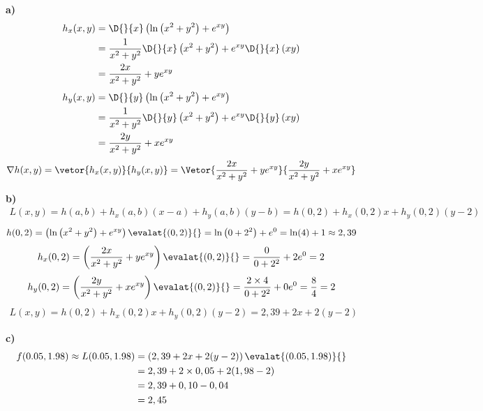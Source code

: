 \documentclass[a4paper,12pt,fleqn]{article}
\begin{document}
\begin{answer}
\textbf{a)}
\vspace{-\baselineskip}
  \begin{align*}
    h_x(x, y)
    & = \D{}{x}\left(\ln\left(x^2+y^2\right) + e^{xy}\right) \\
    & = \frac{1}{x^2+y^2}\D{}{x}\left(x^2+y^2\right)
      + e^{xy}\D{}{x}\left(xy\right) \\
    & = \frac{2x}{x^2+y^2} + ye^{xy}
  \end{align*}
  \begin{align*}
    h_y(x, y)
    & = \D{}{y}\left(\ln\left(x^2+y^2\right) + e^{xy}\right) \\
    & = \frac{1}{x^2+y^2}\D{}{y}\left(x^2+y^2\right)
      + e^{xy}\D{}{y}\left(xy\right) \\
    & = \frac{2y}{x^2+y^2} + xe^{xy}
  \end{align*}
  \[
    \nabla h(x, y)
    = \vetor{h_x(x, y)}{h_y(x, y)}
    = \Vetor{\frac{2x}{x^2+y^2} + ye^{xy}}{\frac{2y}{x^2+y^2} + xe^{xy}}
  \]

\bigskip
\textbf{b)}
\vspace{-\baselineskip}
  \begin{align*}
    L(x, y)
    = h(a, b) + h_x(a, b)(x-a) + h_y(a, b)(y-b)
    = h(0, 2) + h_x(0, 2)x + h_y(0, 2)(y-2)
  \end{align*}
  \begin{align*}
    h(0, 2)
    = \left(\ln\left(x^2+y^2\right) + e^{xy}\right) \evalat{(0, 2)}{}
    = \ln\left(0+2^2\right) + e^{0}
    = \ln(4) + 1
    \approx 2,39
  \end{align*}
  \begin{align*}
    h_x(0, 2)
    = \left(\frac{2x}{x^2+y^2} + ye^{xy}\right) \evalat{(0, 2)}{}
    = \frac{0}{0+2^2} + 2e^0
    = 2
  \end{align*}
  \begin{align*}
    h_y(0, 2)
    = \left(\frac{2y}{x^2+y^2} + xe^{xy}\right) \evalat{(0, 2)}{}
    = \frac{2\times 4}{0+2^2} + 0e^{0}
    = \frac{8}{4}
    = 2
  \end{align*}
    \begin{align*}
      L(x, y)
      = h(0, 2) + h_x(0, 2)x + h_y(0, 2)(y-2)
      = 2,39 + 2x + 2(y-2)
    \end{align*}

\bigskip
\textbf{c)}
\vspace{-\baselineskip}
  \begin{align*}
    f(0.05, 1.98)
    \approx L(0.05, 1.98)
    & = \left(2,39 + 2x + 2(y-2)\right) \evalat{(0.05, 1.98)}{} \\
    & = 2,39 + 2\times 0,05 + 2(1,98-2) \\
    & = 2,39 + 0,10 - 0,04 \\
    & = 2,45
  \end{align*}
\end{answer}

\end{document}
